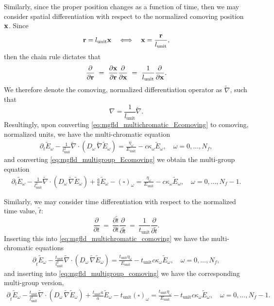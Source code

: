 \documentclass[10pt]{article}
\renewcommand{\(}{\left(}
\renewcommand{\)}{\right)}
\newcommand{\xvec}{{\bf x}}
\newcommand{\rvec}{{\bf r}}
\newcommand{\adot}{\dot{a}}
\newcommand{\Lunit}{l_{\text{unit}}}
\newcommand{\Tunit}{t_{\text{unit}}}
\newcommand{\Eunit}{E_{\text{unit}}}
\newcommand{\tT}{\tilde{t}}
\newcommand{\tE}{\tilde{E}}
\newcommand{\tnabla}{\tilde{\nabla}}
\begin{document}
Similarly, since the proper position changes as a function of time,
then we may consider spatial differentiation with respect to the
normalized comoving position $\xvec$.  Since 
\[
   \rvec = \Lunit \xvec \quad\Longleftrightarrow\quad
   \xvec = \frac{\rvec}{\Lunit},
\]
then the chain rule dictates that
\[
   \frac{\partial}{\partial \rvec} \ = \
   \frac{\partial \xvec}{\partial \rvec}
   \frac{\partial}{\partial \xvec} \ = \
   \frac{1}{\Lunit}\frac{\partial}{\partial \xvec}.
\]
We therefore denote the comoving, normalized differentiation operator
as $\tnabla$, such that 
\[
   \nabla = \frac{1}{\Lunit}\tnabla.
\]
Resultingly, upon converting \eqref{eq:mgfld_multichromatic_Ecomoving}
to comoving, normalized units, we have the multi-chromatic equation
\begin{align}
  \label{eq:mgfld_multichromatic_comoving}
  \partial_{t} \tE_{\omega} - \frac{1}{\Lunit^2}\tnabla\cdot\(D_{\omega}\,\tnabla \tE_{\omega}\)
    = \frac{\eta_{\omega}}{\Eunit} - c\kappa_{\omega} \tE_{\omega}, \quad \omega=0,\ldots,N_f,
\end{align}
and converting \eqref{eq:mgfld_multigroup_Ecomoving} we obtain the
multi-group equation 
\begin{align}
  \label{eq:mgfld_multigroup_comoving}
  \partial_{t} \tE_{\omega} - \frac{1}{\Lunit^2}\tnabla\cdot(D_{\omega}\,\tnabla \tE_{\omega}) +
    \frac{\adot}{a}\tE_{\omega} - (\square)_{\omega} = \frac{\eta_{\omega}}{\Eunit} - c
    \kappa_{\omega} \tE_{\omega}, \quad \omega=0,\ldots,N_f-1.
\end{align}

Similarly, we may consider time differentiation with respect to the
normalized time value, $\tT$:
\[
   \frac{\partial}{\partial t} \ = \
   \frac{\partial \tT}{\partial t} \frac{\partial}{\partial \tT} \ = \
   \frac{1}{\Tunit}\frac{\partial}{\partial \tT}.
\]
Inserting this into \eqref{eq:mgfld_multichromatic_comoving} we have
the multi-chromatic equations
\begin{align}
  \label{eq:mgfld_multichromatic_tnormalized}
  \partial_{\tT} \tE_{\omega} - \frac{\Tunit}{\Lunit^2}\tnabla\cdot\(D_{\omega}\,\tnabla \tE_{\omega}\)
    = \frac{\Tunit\eta_{\omega}}{\Eunit} - \Tunit c\kappa_{\omega} \tE_{\omega}, \quad \omega=0,\ldots,N_f,
\end{align}
and inserting into \eqref{eq:mgfld_multigroup_comoving} we have the
corresponding multi-group version,
\begin{align}
  \label{eq:mgfld_multigroup_tnormalized}
  \partial_{\tT} \tE_{\omega} - \frac{\Tunit}{\Lunit^2}\tnabla\cdot(D_{\omega}\,\tnabla \tE_{\omega}) +
    \frac{\Tunit\adot}{a}\tE_{\omega} - \Tunit(\square)_{\omega} = \frac{\Tunit\eta_{\omega}}{\Eunit} - 
    \Tunit c \kappa_{\omega} \tE_{\omega}, \quad \omega=0,\ldots,N_f-1.
\end{align}
\end{document}
